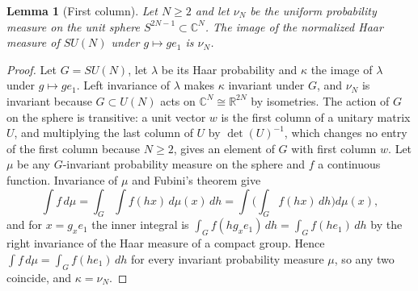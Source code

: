 \documentclass[11pt]{article}
\newtheorem{lemma}{Lemma}
\theoremstyle{remark}
\newcommand{\C}{\mathbb{C}}
\begin{document}
\begin{lemma}[First column]\label{lem:column}
Let $N\ge2$ and let $\nu_N$ be the uniform probability measure on the unit sphere $S^{2N-1}\subset\C^N$. The image of the normalized Haar measure of $SU(N)$ under $g\mapsto ge_1$ is $\nu_N$.
\end{lemma}
\begin{proof}
Let $G=SU(N)$, let $\lambda$ be its Haar probability and $\kappa$ the image of $\lambda$ under $g\mapsto ge_1$. Left invariance of $\lambda$ makes $\kappa$ invariant under $G$, and $\nu_N$ is invariant because $G\subset U(N)$ acts on $\C^N\cong\mathbb R^{2N}$ by isometries. The action of $G$ on the sphere is transitive: a unit vector $w$ is the first column of a unitary matrix $U$, and multiplying the last column of $U$ by $\det(U)^{-1}$, which changes no entry of the first column because $N\ge2$, gives an element of $G$ with first column $w$. Let $\mu$ be any $G$-invariant probability measure on the sphere and $f$ a continuous function. Invariance of $\mu$ and Fubini's theorem give
\[
\int f\,d\mu=\int_G\int f(hx)\,d\mu(x)\,dh=\int\Big(\int_Gf(hx)\,dh\Big)d\mu(x),
\]
and for $x=g_xe_1$ the inner integral is $\int_Gf(hg_xe_1)\,dh=\int_Gf(he_1)\,dh$ by the right invariance of the Haar measure of a compact group. Hence $\int f\,d\mu=\int_Gf(he_1)\,dh$ for every invariant probability measure $\mu$, so any two coincide, and $\kappa=\nu_N$. \qedhere
\end{proof}
\end{document}
